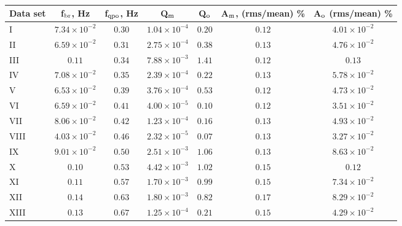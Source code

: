 
\begin{table}
\noindent
\centering
\caption{}
\centering
\begin{tabular}{|l|c|c|c|c|c|c|}
\hline\hline
Data set & f$_{\rm br}$, Hz & f$_{\rm qpo}$, Hz & Q$_{\rm m}$ & Q$_{\rm o}$ & A$_{\rm m}$, (rms/mean) \% & A$_{\rm o}$ (rms/mean) \%\\
\hline

 I      & $7.34\times10^{-2}$   & $0.30$ & $1.04\times10^{-4}$ & $0.20$ & $0.12$ & $4.01\times10^{-2}$ \\
 II     & $6.59\times10^{-2}$   & $0.31$ & $2.75\times10^{-4}$ & $0.38$ & $0.13$ & $4.76\times10^{-2}$ \\
 III    & $0.11$                & $0.34$ & $7.88\times10^{-3}$ & $1.41$ & $0.12$ & $0.13$ \\
 IV     & $7.08\times10^{-2}$   & $0.35$ & $2.39\times10^{-4}$ & $0.22$ & $0.13$ & $5.78\times10^{-2}$ \\
 V      & $6.53\times10^{-2}$   & $0.39$ & $3.76\times10^{-4}$ & $0.53$ & $0.12$ & $4.73\times10^{-2}$ \\
 VI     & $6.59\times10^{-2}$   & $0.41$ & $4.00\times10^{-5}$ & $0.10$ & $0.12$ & $3.51\times10^{-2}$ \\
 VII    & $8.06\times10^{-2}$   & $0.42$ & $1.23\times10^{-4}$ & $0.16$ & $0.13$ & $4.93\times10^{-2}$ \\
 VIII   & $4.03\times10^{-2}$   & $0.46$ & $2.32\times10^{-5}$ & $0.07$ & $0.13$ & $3.27\times10^{-2}$ \\
 IX     & $9.01\times10^{-2}$   & $0.50$ & $2.51\times10^{-3}$ & $1.06$ & $0.13$ & $8.63\times10^{-2}$ \\
 X      & $0.10$                & $0.53$ & $4.42\times10^{-3}$ & $1.02$ & $0.15$ & $0.12$ \\
 XI     & $0.11$                & $0.57$ & $1.70\times10^{-3}$ & $0.99$ & $0.15$ & $7.34\times10^{-2}$ \\
 XII    & $0.14$                & $0.63$ & $1.80\times10^{-3}$ & $0.82$ & $0.17$ & $8.29\times10^{-2}$ \\
 XIII   & $0.13$                & $0.67$ & $1.25\times10^{-4}$ & $0.21$ & $0.15$ & $4.29\times10^{-2}$ \\
\hline
\end{tabular}
\end{table}

